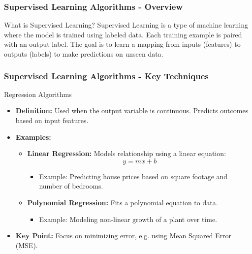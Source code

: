 \documentclass[aspectratio=169]{beamer}
\begin{document}
\begin{frame}[fragile]
    \frametitle{Supervised Learning Algorithms - Overview}
    \begin{block}{What is Supervised Learning?}
        Supervised Learning is a type of machine learning where the model is trained using labeled data. 
        Each training example is paired with an output label. The goal is to learn a mapping from inputs 
        (features) to outputs (labels) to make predictions on unseen data.
    \end{block}
\end{frame}

\begin{frame}[fragile]
    \frametitle{Supervised Learning Algorithms - Key Techniques}
    \begin{block}{Regression Algorithms}
        \begin{itemize}
            \item \textbf{Definition:} Used when the output variable is continuous. Predicts outcomes based on input features.
            \item \textbf{Examples:}
            \begin{itemize}
                \item \textbf{Linear Regression:} Models relationship using a linear equation: 
                \[
                y = mx + b
                \]
                \begin{itemize}
                    \item Example: Predicting house prices based on square footage and number of bedrooms.
                \end{itemize}
                \item \textbf{Polynomial Regression:} Fits a polynomial equation to data.
                \begin{itemize}
                    \item Example: Modeling non-linear growth of a plant over time.
                \end{itemize}
            \end{itemize}
            \item \textbf{Key Point:} Focus on minimizing error, e.g. using Mean Squared Error (MSE).
        \end{itemize}
    \end{block}
\end{frame}
\end{document}
